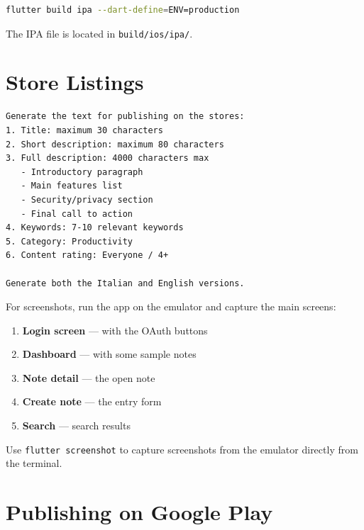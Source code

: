 \begin{lstlisting}[language=bash]
flutter build ipa --dart-define=ENV=production
\end{lstlisting}

The IPA file is located in \texttt{build/ios/ipa/}.

\section{Store Listings}

\begin{praticabox}[title={Hands-on --- Generate the text with AI}]
\begin{lstlisting}[language={}]
Generate the text for publishing on the stores:
1. Title: maximum 30 characters
2. Short description: maximum 80 characters
3. Full description: 4000 characters max
   - Introductory paragraph
   - Main features list
   - Security/privacy section
   - Final call to action
4. Keywords: 7-10 relevant keywords
5. Category: Productivity
6. Content rating: Everyone / 4+

Generate both the Italian and English versions.
\end{lstlisting}
\end{praticabox}

For screenshots, run the app on the emulator and capture the main screens:

\begin{enumerate}
  \item \textbf{Login screen} --- with the OAuth buttons
  \item \textbf{Dashboard} --- with some sample notes
  \item \textbf{Note detail} --- the open note
  \item \textbf{Create note} --- the entry form
  \item \textbf{Search} --- search results
\end{enumerate}

\begin{tipbox}
Use \texttt{flutter screenshot} to capture screenshots from the emulator directly from the terminal.
\end{tipbox}

\section{Publishing on Google Play}

